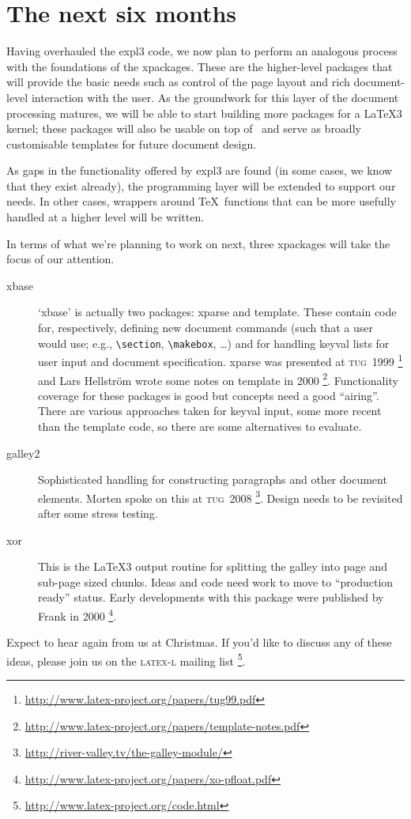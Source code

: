 \documentclass{ltnews}
\newcommand\TUG[1]{\textsc{tug}~#1}
\begin{document}
\section{The next six months}

Having overhauled the \textsf{expl3} code, we now plan to perform an
analogous process with the foundations of the
\textsf{xpackages}. These are the higher-level packages that will
provide the basic needs such as control of the page layout and rich
document-level interaction with the user. As the groundwork for this
layer of the document processing matures, we will be able to start
building more packages for a \LaTeX3 kernel; these packages will also
be usable on top of \LaTeXe\ and serve as broadly customisable
templates for future document design.

As gaps in the functionality offered by \textsf{expl3} are found (in
some cases, we know that they exist already), the programming layer
will be extended to support our needs. In other cases, wrappers around
\TeX\ functions that can be more usefully handled at a higher level
will be written.

In terms of what we're planning to work on next, three \textsf{xpackage}s
will take the focus of our attention.
\begin{description}
\item [xbase] 
  `\textsf{xbase}' is actually two packages: \textsf{xparse} and
  \textsf{template}. These contain code for, respectively, defining new
  document commands (such that a user would use; e.g., \verb|\section|,
  \verb|\makebox|, \dots) and for handling keyval lists for user input and
  document specification. \textsf{xparse} was presented at \TUG{1999}%
  \footnote{\url{http://www.latex-project.org/papers/tug99.pdf}}
  and Lars Hellstr\"om wrote some notes on \textsf{template} in 2000%
  \footnote{\url{http://www.latex-project.org/papers/template-notes.pdf}}.
  Functionality coverage for these packages is good but concepts need a good
  ``airing''. There are various approaches taken for keyval input, some more
  recent than the \textsf{template} code, so there are some alternatives to
  evaluate.
\item [galley2] Sophisticated handling for \mbox{constructing} paragraphs and
  other document elements. Morten spoke on this at \TUG{2008}%
  \footnote{\url{http://river-valley.tv/the-galley-module/}}.
  Design needs to be revisited after some stress testing.
\item [xor] This is the \LaTeX3 output routine for splitting the galley into 
  page and sub-page sized chunks. Ideas and code need work to move to
  ``production ready'' status. Early developments with this package were
  published by Frank in 2000%
  \footnote{\url{http://www.latex-project.org/papers/xo-pfloat.pdf}}.
\end{description}

Expect to hear again from us at Christmas. If you'd like to discuss any
of these ideas, please join us on the \textsc{latex-l} mailing list%
\footnote{\url{http://www.latex-project.org/code.html}}.
\end{document}
